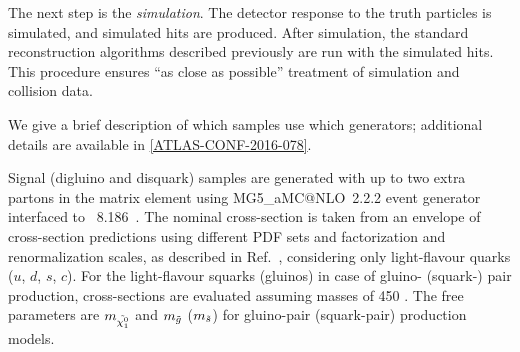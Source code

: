 The next step is the \textit{simulation}.
The detector response to the truth particles is simulated, and simulated hits are produced.
After simulation, the standard reconstruction algorithms described previously are run with the simulated hits.
This procedure ensures ``as close as possible'' treatment of simulation and collision data.

We give a brief description of which samples use which generators; additional details are available in \ref{ATLAS-CONF-2016-078}.

Signal (digluino and disquark) samples are generated with up to two extra partons in the matrix element using MG5\_aMC@NLO~2.2.2 event generator~\cite{Alwall:2014hca} interfaced to  \pythia~8.186~\cite{Sjostrand:2014zea}.
The nominal cross-section is taken from an envelope of cross-section predictions using different PDF sets and factorization and renormalization scales, as described in Ref.~\cite{Kramer:2012bx}, considering only light-flavour quarks ($u$, $d$, $s$, $c$).
For the light-flavour squarks (gluinos) in case of gluino- (squark-) pair production, cross-sections are evaluated assuming masses of 450 \TeV.
The free parameters are $m_{\tilde{\chi^0_1}}$ and $m_{\tilde{g}}$ ($m_{\tilde{s}}$) for gluino-pair (squark-pair) production models.

